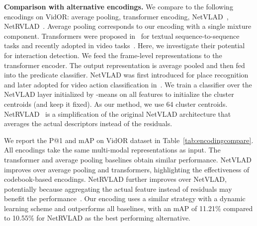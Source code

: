 \documentclass[10pt,twocolumn,letterpaper]{article}
\begin{document}
\textbf{Comparison with alternative encodings.}
We compare to the following encodings on VidOR: average pooling, transformer encoding, NetVLAD~\cite{girdhar2017actionvlad}, NetRVLAD~\cite{miech2017learnable}. 
Average pooling corresponds to our encoding with a single mixture component. Transformers were proposed in~\cite{vaswani2017attention} for textual sequence-to-sequence tasks and recently adopted in  video tasks~\cite{byvshev2020heterogeneous,girdhar2019video,gavrilyuk2020actor}. 
Here, we investigate their potential for interaction detection. We feed the frame-level representations to the transformer encoder. The output representation is average pooled and then fed into the predicate classifier. NetVLAD was first introduced for place recognition and later adopted for video action classification in~\cite{girdhar2017actionvlad}. We train a classifier over the NetVLAD layer initialized by -means on all features to initialize the cluster centroids (and keep it fixed). As our method, we use 64 cluster centroids. NetRVLAD~\cite{miech2017learnable} is a simplification of the original NetVLAD architecture that averages the actual descriptors instead of the residuals.

We report the P@1 and mAP on VidOR dataset in Table~\ref{tab:encodingcompare}. 
All encodings take the same multi-modal representations as input. 
The transformer and average pooling baselines obtain similar performance. NetVLAD improves over average pooling and transformers, highlighting the effectiveness of codebook-based encodings. NetRVLAD further improves over NetVLAD, potentially because aggregating the actual feature instead of residuals may benefit the performance~\cite{douze2013stable}. Our encoding uses a similar strategy with a dynamic learning scheme and outperforms all baselines, with an mAP of 11.21\% compared to 10.55\% for NetRVLAD as the best performing alternative.
\end{document}
